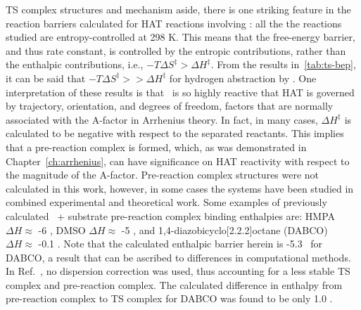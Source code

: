 
TS complex structures and mechanism aside, there is one striking feature in the
reaction barriers calculated for HAT reactions involving \cumo: all the the
reactions studied are entropy-controlled at 298 K. This means that the
free-energy barrier, and thus rate constant, is controlled by the entropic
contributions, rather than the enthalpic contributions, i.e., $-T\Delta
S^\ddagger > \Delta H^\ddagger$. From the results in~\ref{tab:ts-bep}, it can
be said that $-T\Delta S^\ddagger >> \Delta H^\ddagger$ for hydrogen
abstraction by \cumo. One interpretation of these results is that \cumo\ is so
highly reactive that HAT is governed by trajectory, orientation, and degrees of
freedom, factors that are normally associated with the A-factor in Arrhenius
theory. In fact, in many cases, $\Delta H^\ddagger$ is calculated to be
negative with respect to the separated reactants. This implies that a
pre-reaction complex is formed, which, as was demonstrated in
Chapter~\ref{ch:arrhenius}, can have significance on HAT reactivity with
respect to the magnitude of the A-factor. Pre-reaction complex structures were
not calculated in this work, however, in some cases the systems have been
studied in combined experimental and theoretical work. Some examples of
previously calculated \cumo\ + substrate pre-reaction complex binding
enthalpies are: HMPA\footnotemark\ $\Delta H \approx$ -6 \kcalmol, DMSO $\Delta
H \approx$ -5 \kcalmol, and 1,4-diazobicyclo[2.2.2]octane
(DABCO)\cite{Salamone2011b} $\Delta H \approx$ -0.1 \kcalmol. Note that the
calculated enthalpic barrier herein is -5.3 \kcalmol\ for DABCO, a result that
can be ascribed to differences in computational methods. In
Ref.~, no dispersion correction was used, thus
accounting for a less stable TS complex and pre-reaction complex. The
calculated difference in enthalpy from pre-reaction complex to TS complex for
DABCO was found to be only 1.0 \kcalmol.


